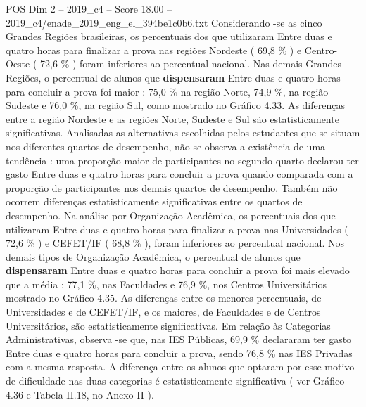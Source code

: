 \begin{textsample}{POS Dim 2 – 2019\_c4 – Score 18.00 – 2019\_c4/enade\_2019\_eng\_el\_394be1c0b6.txt}
Considerando -se as cinco Grandes Regiões brasileiras, os percentuais dos que utilizaram Entre duas e quatro horas para finalizar a prova nas regiões Nordeste ( 69,8 \% ) e Centro-Oeste ( 72,6 \% ) foram inferiores ao percentual nacional.
Nas demais Grandes Regiões, o percentual de alunos que \textbf{dispensaram} Entre duas e quatro horas para concluir a prova foi maior : 75,0 \% na região Norte, 74,9 \%, na região Sudeste e 76,0 \%, na região Sul, como mostrado no Gráfico 4.33.
As diferenças entre a região Nordeste e as regiões Norte, Sudeste e Sul são estatisticamente significativas.
Analisadas as alternativas escolhidas pelos estudantes que se situam nos diferentes quartos de desempenho, não se observa a existência de uma tendência : uma proporção maior de participantes no segundo quarto declarou ter gasto Entre duas e quatro horas para concluir a prova quando comparada com a proporção de participantes nos demais quartos de desempenho.
Também não ocorrem diferenças estatisticamente significativas entre os quartos de desempenho.
Na análise por Organização Acadêmica, os percentuais dos que utilizaram Entre duas e quatro horas para finalizar a prova nas Universidades ( 72,6 \% ) e CEFET/IF ( 68,8 \% ), foram inferiores ao percentual nacional.
Nos demais tipos de Organização Acadêmica, o percentual de alunos que \textbf{dispensaram} Entre duas e quatro horas para concluir a prova foi mais elevado que a média : 77,1 \%, nas Faculdades e 76,9 \%, nos Centros Universitários mostrado no Gráfico 4.35.
As diferenças entre os menores percentuais, de Universidades e de CEFET/IF, e os maiores, de Faculdades e de Centros Universitários, são estatisticamente significativas.
Em relação às Categorias Administrativas, observa -se que, nas IES Públicas, 69,9 \% declararam ter gasto Entre duas e quatro horas para concluir a prova, sendo 76,8 \% nas IES Privadas com a mesma resposta.
A diferença entre os alunos que optaram por esse motivo de dificuldade nas duas categorias é estatisticamente significativa ( ver Gráfico 4.36 e Tabela II.18, no Anexo II ).

\end{textsample}
